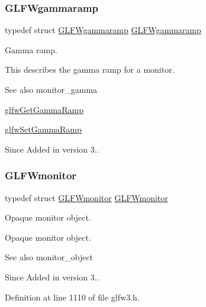\subsubsection{\texorpdfstring{GLFWgammaramp}{GLFWgammaramp}}
{\footnotesize\ttfamily typedef struct \mbox{\hyperlink{struct_g_l_f_wgammaramp}{G\+L\+F\+Wgammaramp}}  \mbox{\hyperlink{struct_g_l_f_wgammaramp}{G\+L\+F\+Wgammaramp}}}



Gamma ramp. 

This describes the gamma ramp for a monitor.

\begin{DoxySeeAlso}{See also}
monitor\+\_\+gamma 

\mbox{\hyperlink{group__monitor_gaeeac9198f3c91b83440eed679441f76b}{glfw\+Get\+Gamma\+Ramp}} 

\mbox{\hyperlink{group__monitor_gac9f36a1cfa10eab191d3029ea8bc9558}{glfw\+Set\+Gamma\+Ramp}}
\end{DoxySeeAlso}
\begin{DoxySince}{Since}
Added in version 3.. 
\end{DoxySince}
\mbox{\label{group__monitor_ga8d9efd1cde9426692c73fe40437d0ae3}} 
\subsubsection{\texorpdfstring{GLFWmonitor}{GLFWmonitor}}
{\footnotesize\ttfamily typedef struct \mbox{\hyperlink{group__monitor_ga8d9efd1cde9426692c73fe40437d0ae3}{G\+L\+F\+Wmonitor}} \mbox{\hyperlink{group__monitor_ga8d9efd1cde9426692c73fe40437d0ae3}{G\+L\+F\+Wmonitor}}}



Opaque monitor object. 

Opaque monitor object.

\begin{DoxySeeAlso}{See also}
monitor\+\_\+object
\end{DoxySeeAlso}
\begin{DoxySince}{Since}
Added in version 3.. 
\end{DoxySince}


Definition at line 1110 of file glfw3.\+h.

\mbox{\label{group__monitor_ga8a7ee579a66720f24d656526f3e44c63}} 
